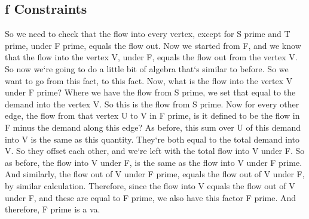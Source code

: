 \subsection{f Constraints}
So we need to check that the flow into every vertex, except for S prime and T prime, under F prime, equals the flow out.
Now we started from F, and we know that the flow into the vertex V, under F, equals the flow out from the vertex V\@.
So now we`re going to do a little bit of algebra that`s similar to before.
So we want to go from this fact, to this fact.
Now, what is the flow into the vertex V under F prime? Where we have the flow from S prime, we set that equal to the demand into the vertex V\@.
So this is the flow from S prime.
Now for every other edge, the flow from that vertex U to V in F prime, is it defined to be the flow in F minus the demand along this edge? As before, this sum over U of this demand into V is the same as this quantity.
They`re both equal to the total demand into V\@.
So they offset each other, and we`re left with the total flow into V under F\@.
So as before, the flow into V under F, is the same as the flow into V under F prime.
And similarly, the flow out of V under F prime, equals the flow out of V under F, by similar calculation.
Therefore, since the flow into V equals the flow out of V under F, and these are equal to F prime, we also have this factor F prime.
And therefore, F prime is a va.

